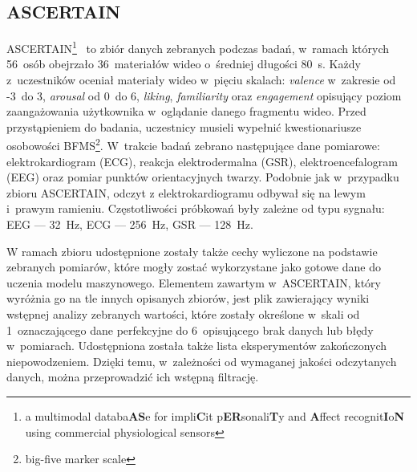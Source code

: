 \subsection{ASCERTAIN}
ASCERTAIN\footnote{a multimodal databa\textbf{AS}e for impli\textbf{C}it p\textbf{ER}sonali\textbf{T}y and \textbf{A}ffect recognit\textbf{I}o\textbf{N} using commercial physiological sensors}~\cite{ascertain_dataset_2016} to zbiór danych zebranych podczas badań, w~ramach których 56~osób obejrzało 36~materiałów wideo o~średniej długości 80~s. Każdy z~uczestników oceniał materiały wideo w~pięciu skalach: \textit{valence} w~zakresie od -3~do 3, \textit{arousal} od 0~do 6, \textit{liking}, \textit{familiarity} oraz \textit{engagement} opisujący poziom zaangażowania użytkownika w~oglądanie danego fragmentu wideo. Przed przystąpieniem do badania, uczestnicy musieli wypełnić kwestionariusze osobowości BFMS\footnote{big-five marker scale}.  W~trakcie badań zebrano następujące dane pomiarowe: elektrokardiogram (ECG), reakcja elektrodermalna (GSR), elektroencefalogram (EEG) oraz pomiar punktów orientacyjnych twarzy. Podobnie jak w~przypadku zbioru ASCERTAIN, odczyt z elektrokardiogramu odbywał się na lewym i~prawym ramieniu. Częstotliwości próbkowań były zależne od typu sygnału: EEG --- 32~Hz, ECG --- 256~Hz, GSR --- 128~Hz.

W ramach zbioru udostępnione zostały także cechy wyliczone na podstawie zebranych pomiarów, które mogły zostać wykorzystane jako gotowe dane do uczenia modelu maszynowego. Elementem zawartym w~ASCERTAIN, który wyróżnia go na tle innych opisanych zbiorów, jest plik zawierający wyniki wstępnej analizy zebranych wartości, które zostały określone w~skali od 1~oznaczającego dane perfekcyjne do 6~opisującego brak danych lub błędy w~pomiarach.  Udostępniona została także lista eksperymentów zakończonych niepowodzeniem. Dzięki temu, w~zależności od wymaganej jakości odczytanych danych, można przeprowadzić ich wstępną filtrację.

